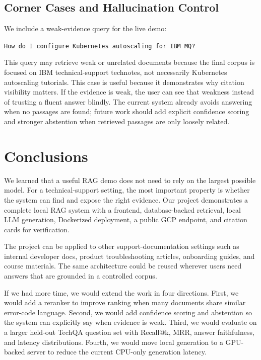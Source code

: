 \documentclass[paper=a4, fontsize=11pt]{scrartcl}
\begin{document}
\subsection{Corner Cases and Hallucination Control}

We include a weak-evidence query for the live demo:

\begin{center}
\texttt{How do I configure Kubernetes autoscaling for IBM MQ?}
\end{center}

This query may retrieve weak or unrelated documents because the final corpus is focused on IBM technical-support technotes, not necessarily Kubernetes autoscaling tutorials. This case is useful because it demonstrates why citation visibility matters. If the evidence is weak, the user can see that weakness instead of trusting a fluent answer blindly. The current system already avoids answering when no passages are found; future work should add explicit confidence scoring and stronger abstention when retrieved passages are only loosely related.

\section{Conclusions}

We learned that a useful RAG demo does not need to rely on the largest possible model. For a technical-support setting, the most important property is whether the system can find and expose the right evidence. Our project demonstrates a complete local RAG system with a frontend, database-backed retrieval, local LLM generation, Dockerized deployment, a public GCP endpoint, and citation cards for verification.

The project can be applied to other support-documentation settings such as internal developer docs, product troubleshooting articles, onboarding guides, and course materials. The same architecture could be reused wherever users need answers that are grounded in a controlled corpus.

If we had more time, we would extend the work in four directions. First, we would add a reranker to improve ranking when many documents share similar error-code language. Second, we would add confidence scoring and abstention so the system can explicitly say when evidence is weak. Third, we would evaluate on a larger held-out TechQA question set with Recall@k, MRR, answer faithfulness, and latency distributions. Fourth, we would move local generation to a GPU-backed server to reduce the current CPU-only generation latency.
\end{document}
